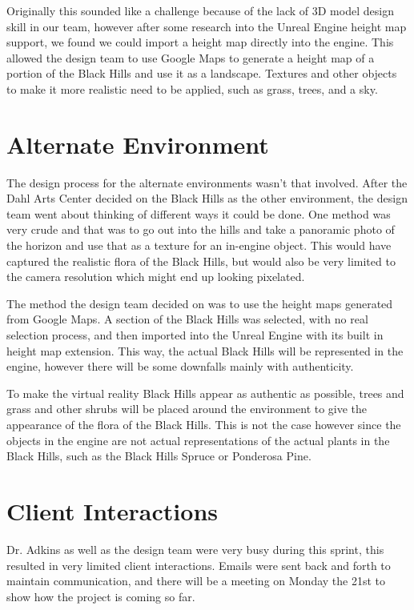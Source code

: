 \documentclass[11pt]{book}
\begin{document}
Originally this sounded like a challenge because of the lack of 3D model design skill in our team, however after some research into the Unreal Engine height map support, we found we could import a height map directly into the engine.  This allowed the design team to use Google Maps to generate a height map of a portion of the Black Hills and use it as a landscape.  Textures and other objects to make it more realistic need to be applied, such as grass, trees, and a sky. 
 
\section*{Alternate Environment}
The design process for the alternate environments wasn't that involved.  After the Dahl Arts Center decided on the Black Hills as the other environment, the design team went about thinking of different ways it could be done.  One method was very crude and that was to go out into the hills and take a panoramic photo of the horizon and use that as a texture for an in-engine object. This would have captured the realistic flora of the Black Hills, but would also be very limited to the camera resolution which might end up looking pixelated.  

The method the design team decided on was to use the height maps generated from Google Maps. A section of the Black Hills was selected, with no real selection process, and then imported into the Unreal Engine with its built in height map extension.  This way, the actual Black Hills will be represented in the engine, however there will be some downfalls mainly with authenticity. 

To make the virtual reality Black Hills appear as authentic as possible, trees and grass and other shrubs will be placed around the environment to give the appearance of the flora of the Black Hills.  This is not the case however since the objects in the engine are not actual representations of the actual plants in the Black Hills, such as the Black Hills Spruce or Ponderosa Pine.

\section*{Client Interactions}
Dr. Adkins as well as the design team were very busy during this sprint, this resulted in very limited client interactions.  Emails were sent back and forth to maintain communication, and there will be a meeting on Monday the 21st to show how the project is coming so far. 
	
\end{document}
